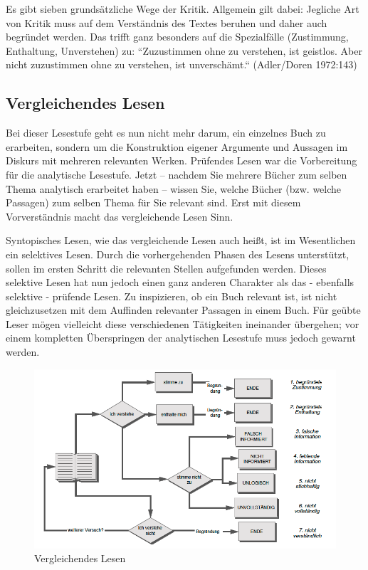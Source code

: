 \documentclass[]{book}
\theoremstyle{definition}
\theoremstyle{definition}
\theoremstyle{definition}
\theoremstyle{remark}
\begin{document}
Es gibt sieben grundsätzliche Wege der Kritik. Allgemein gilt dabei:
Jegliche Art von Kritik muss auf dem Verständnis des Textes beruhen und
daher auch begründet werden. Das trifft ganz besonders auf die
Spezialfälle (Zustimmung, Enthaltung, Unverstehen) zu: ``Zuzustimmen
ohne zu verstehen, ist geistlos. Aber nicht zuzustimmen ohne zu
verstehen, ist unverschämt.`` (Adler/Doren 1972:143)

\subsection{Vergleichendes Lesen}\label{vergleichendes-lesen}

Bei dieser Lesestufe geht es nun nicht mehr darum, ein einzelnes Buch zu
erarbeiten, sondern um die Konstruktion eigener Argumente und Aussagen
im Diskurs mit mehreren relevanten Werken. Prüfendes Lesen war die
Vorbereitung für die analytische Lesestufe. Jetzt -- nachdem Sie mehrere
Bücher zum selben Thema analytisch erarbeitet haben -- wissen Sie,
welche Bücher (bzw. welche Passagen) zum selben Thema für Sie relevant
sind. Erst mit diesem Vorverständnis macht das vergleichende Lesen Sinn.

Syntopisches Lesen, wie das vergleichende Lesen auch heißt, ist im
Wesentlichen ein selektives Lesen. Durch die vorhergehenden Phasen des
Lesens unterstützt, sollen im ersten Schritt die relevanten Stellen
aufgefunden werden. Dieses selektive Lesen hat nun jedoch einen ganz
anderen Charakter als das - ebenfalls selektive - prüfende Lesen. Zu
inspizieren, ob ein Buch relevant ist, ist nicht gleichzusetzen mit dem
Auffinden relevanter Passagen in einem Buch. Für geübte Leser mögen
vielleicht diese verschiedenen Tätigkeiten ineinander übergehen; vor
einem kompletten Überspringen der analytischen Lesestufe muss jedoch
gewarnt werden.

\begin{figure}

{\centering \includegraphics{images/lesen-vergleichendes-min} 

}

\caption{Vergleichendes Lesen}\label{fig:unnamed-chunk-18}
\end{figure}
\end{document}

